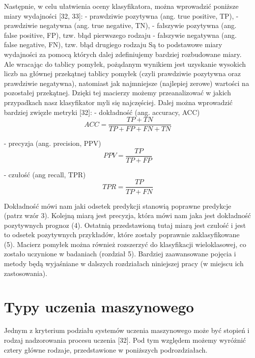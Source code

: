 Następnie, w celu ułatwienia oceny klasyfikatora, można wprowadzić poniższe miary wydajności [32, 33]:
- prawdziwie pozytywna (ang. true positive, TP),
- prawdziwie negatywna (ang. true negative, TN),
- fałszywie pozytywna (ang. false positive, FP), tzw. błąd pierwszego rodzaju
- fałszywie negatywna (ang. false negative, FN), tzw. błąd drugiego rodzaju
Są to podstawowe miary wydajności za pomocą których dalej zdefiniujemy bardziej rozbudowane miary. Ale wracając do tablicy pomyłek, pożądanym wynikiem jest uzyskanie wysokich liczb na głównej przekątnej tablicy pomyłek (czyli prawdziwie pozytywna oraz prawdziwie negatywna), natomiast jak najmniejsze (najlepiej zerowe) wartości na pozostałej przekątnej. Dzięki tej macierzy możemy przeanalizować w jakich przypadkach nasz klasyfikator myli się najczęściej. Dalej można wprowadzić bardziej zwięzłe metryki [32]:
- dokładność (ang. accuracy, ACC)
\begin{equation}
ACC=\frac {TP+TN} {TP+FP+FN+TN}
\end{equation}

- precyzja (ang. precision, PPV)
\begin{equation}
PPV=\frac {TP} {TP+FP}
\end{equation}

- czułość (ang recall, TPR)
\begin{equation}
TPR=\frac {TP} {TP+FN}
\end{equation}

Dokładność mówi nam jaki odsetek predykcji stanowią poprawne predykcje (patrz wzór 3). Kolejną miarą jest precyzja, która mówi nam jaka jest dokładność pozytywnych prognoz (4). Ostatnią przedstawioną tutaj miarą jest czułość i jest to odsetek pozytywnych przykładów, które zostały poprawnie zaklasyfikowane (5). Macierz pomyłek można również rozszerzyć do klasyfikacji wieloklasowej, co zostało uczynione w badaniach (rozdział 5). Bardziej zaawansowane pojęcia i metody będą wyjaśniane w dalszych rozdziałach niniejszej pracy (w miejscu ich zastosowania).

\section{Typy uczenia maszynowego}
\label{cha:cha3.2}

Jednym z kryterium podziału systemów uczenia maszynowego może być stopień i rodzaj nadzorowania procesu uczenia [32]. Pod tym względem możemy wyróżnić cztery główne rodzaje, przedstawione w poniższych podrozdziałach.


